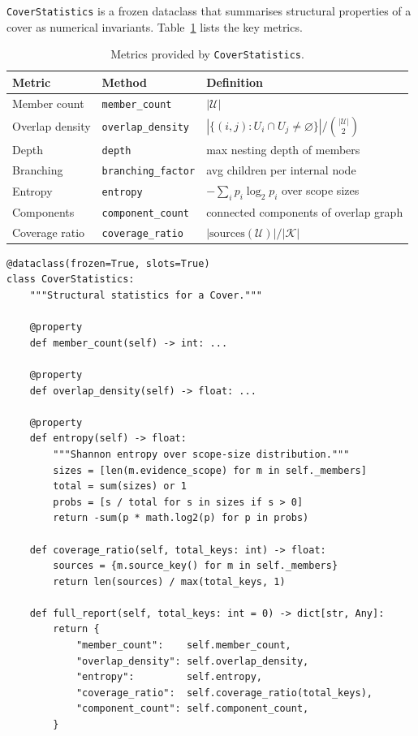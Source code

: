 \documentclass[11pt]{article}
\begin{document}
\texttt{CoverStatistics} is a frozen dataclass that summarises
structural properties of a cover as numerical invariants.
Table~\ref{tab:stats} lists the key metrics.

\begin{table}[h]
\centering
\caption{Metrics provided by \texttt{CoverStatistics}.}
\label{tab:stats}
\begin{tabular}{lll}
\toprule
\textbf{Metric} & \textbf{Method} & \textbf{Definition} \\
\midrule
Member count   & \texttt{member\_count}    & $|\mathcal{U}|$ \\
Overlap density& \texttt{overlap\_density} & $|\{(i,j): U_i \cap U_j \neq \varnothing\}| / \binom{|\mathcal{U}|}{2}$ \\
Depth          & \texttt{depth}            & max nesting depth of members \\
Branching      & \texttt{branching\_factor}& avg children per internal node \\
Entropy        & \texttt{entropy}          & $-\sum_i p_i \log_2 p_i$ over scope sizes \\
Components     & \texttt{component\_count} & connected components of overlap graph \\
Coverage ratio & \texttt{coverage\_ratio}  & $|\mathrm{sources}(\mathcal{U})| / |\mathcal{K}|$ \\
\bottomrule
\end{tabular}
\end{table}

\begin{lstlisting}[style=jugeo-python,
  caption={Selected \texttt{CoverStatistics} methods.},
  label={lst:stats}]
@dataclass(frozen=True, slots=True)
class CoverStatistics:
    """Structural statistics for a Cover."""

    @property
    def member_count(self) -> int: ...

    @property
    def overlap_density(self) -> float: ...

    @property
    def entropy(self) -> float:
        """Shannon entropy over scope-size distribution."""
        sizes = [len(m.evidence_scope) for m in self._members]
        total = sum(sizes) or 1
        probs = [s / total for s in sizes if s > 0]
        return -sum(p * math.log2(p) for p in probs)

    def coverage_ratio(self, total_keys: int) -> float:
        sources = {m.source_key() for m in self._members}
        return len(sources) / max(total_keys, 1)

    def full_report(self, total_keys: int = 0) -> dict[str, Any]:
        return {
            "member_count":    self.member_count,
            "overlap_density": self.overlap_density,
            "entropy":         self.entropy,
            "coverage_ratio":  self.coverage_ratio(total_keys),
            "component_count": self.component_count,
        }
\end{lstlisting}
\end{document}
